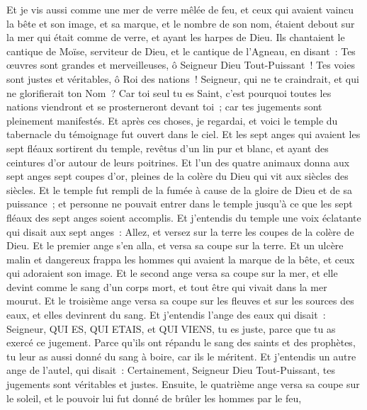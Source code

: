 \begin{multicols}{2}
Et je vis aussi comme une mer de verre mêlée de feu, et ceux qui avaient vaincu la bête et son image, et sa marque, et le nombre de son nom, étaient debout sur la mer qui était comme de verre, et ayant les harpes de Dieu.
Ils chantaient le cantique de Moïse, serviteur de Dieu, et le cantique de l'Agneau, en disant~: Tes œuvres sont grandes et merveilleuses, ô Seigneur Dieu Tout-Puissant~! Tes voies sont justes et véritables, ô Roi des nations~!
Seigneur, qui ne te craindrait, et qui ne glorifierait ton Nom~? Car toi seul tu es Saint, c'est pourquoi toutes les nations viendront et se prosterneront devant toi~; car tes jugements sont pleinement manifestés.
Et après ces choses, je regardai, et voici le temple du tabernacle du témoignage fut ouvert dans le ciel.
Et les sept anges qui avaient les sept fléaux sortirent du temple, revêtus d'un lin pur et blanc, et ayant des ceintures d'or autour de leurs poitrines.
Et l'un des quatre animaux donna aux sept anges sept coupes d'or, pleines de la colère du Dieu qui vit aux siècles des siècles.
Et le temple fut rempli de la fumée à cause de la gloire de Dieu et de sa puissance~; et personne ne pouvait entrer dans le temple jusqu'à ce que les sept fléaux des sept anges soient accomplis.
\VerseOne{}Et j'entendis du temple une voix éclatante qui disait aux sept anges~: Allez, et versez sur la terre les coupes de la colère de Dieu.
Et le premier ange s'en alla, et versa sa coupe sur la terre. Et un ulcère malin et dangereux frappa les hommes qui avaient la marque de la bête, et ceux qui adoraient son image.
Et le second ange versa sa coupe sur la mer, et elle devint comme le sang d'un corps mort, et tout être qui vivait dans la mer mourut.
Et le troisième ange versa sa coupe sur les fleuves et sur les sources des eaux, et elles devinrent du sang.
Et j'entendis l'ange des eaux qui disait~: Seigneur, QUI ES, QUI ETAIS, et QUI VIENS, tu es juste, parce que tu as exercé ce jugement.
Parce qu'ils ont répandu le sang des saints et des prophètes, tu leur as aussi donné du sang à boire, car ils le méritent.
Et j'entendis un autre ange de l'autel, qui disait~: Certainement, Seigneur Dieu Tout-Puissant, tes jugements sont véritables et justes.
Ensuite, le quatrième ange versa sa coupe sur le soleil, et le pouvoir lui fut donné de brûler les hommes par le feu,

\end{multicols}
